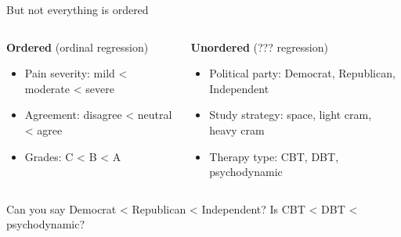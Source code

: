 \documentclass[
  ignorenonframetext,
]{beamer}
\providecommand{\tightlist}{%
  \setlength{\itemsep}{0pt}\setlength{\parskip}{0pt}}
\begin{document}
\begin{frame}[fragile]{But not everything is ordered}
\label{but-not-everything-is-ordered}
\begin{columns}[T]
\begin{column}{0.5\linewidth}
\textbf{Ordered} (ordinal regression)

\begin{itemize}
\tightlist
\item
  Pain severity: mild \textless{} moderate \textless{} severe
\item
  Agreement: disagree \textless{} neutral \textless{} agree
\item
  Grades: C \textless{} B \textless{} A
\end{itemize}
\end{column}

\begin{column}{0.5\linewidth}
\textbf{Unordered} (??? regression)

\begin{itemize}
\tightlist
\item
  Political party: Democrat, Republican, Independent
\item
  Study strategy: space, light cram, heavy cram
\item
  Therapy type: CBT, DBT, psychodynamic
\end{itemize}
\end{column}
\end{columns}


\pause

\begin{tcolorbox}[enhanced jigsaw, colback=white, coltitle=black, titlerule=0mm, rightrule=.15mm, bottomtitle=1mm, leftrule=.75mm, opacitybacktitle=0.6, breakable, title=\textcolor{quarto-callout-warning-color}{\faExclamationTriangle}\hspace{0.5em}{The problem}, arc=.35mm, toptitle=1mm, bottomrule=.15mm, colframe=quarto-callout-warning-color-frame, colbacktitle=quarto-callout-warning-color!10!white, toprule=.15mm, opacityback=0, left=2mm]

Can you say Democrat \textless{} Republican \textless{} Independent? Is
CBT \textless{} DBT \textless{} psychodynamic?


\end{tcolorbox}
\end{frame}
\end{document}
